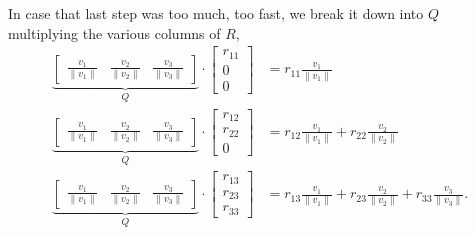 In case that last step was too much, too fast, we break it down into $Q$ multiplying the various columns of $R$,
\begin{align*}
\underbrace{\left[ \begin{array}{ccc}\frac{v_1}{\| v_1 \|} 
& \frac{v_2}{\| v_2 \|}
&   \frac{v_3}{\| v_3 \|} \end{array} \right]}_{Q} \cdot 
\left[ \begin{array}{c}r_{11} \\0 \\ 0\end{array} \right] &= r_{11}  \frac{v_1}{\| v_1 \|} \\
\underbrace{\left[ \begin{array}{ccc}\frac{v_1}{\| v_1 \|} 
& \frac{v_2}{\| v_2 \|}
&   \frac{v_3}{\| v_3 \|} \end{array} \right]}_{Q} \cdot 
\left[ \begin{array}{c}r_{12} \\ r_{22}\\ 0\end{array} \right] &=  r_{12}  \frac{v_1}{\| v_1 \|} +  r_{22}  \frac{v_2}{\| v_2 \|}\\
\underbrace{\left[ \begin{array}{ccc}\frac{v_1}{\| v_1 \|} 
& \frac{v_2}{\| v_2 \|}
&   \frac{v_3}{\| v_3 \|} \end{array} \right]}_{Q} \cdot 
\left[ \begin{array}{c}r_{13} \\ r_{23}\\r_{33}\end{array} \right] &=   r_{13}  \frac{v_1}{\| v_1 \|} +  r_{23}  \frac{v_2}{\| v_2 \|} + 
r_{33} \frac{v_3}{\| v_3 \|}.
\end{align*}


